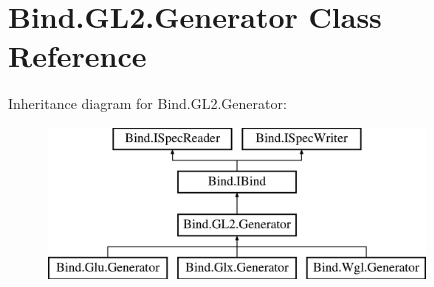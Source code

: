 \hypertarget{class_bind_1_1_g_l2_1_1_generator}{
\section{Bind.GL2.Generator Class Reference}
\label{class_bind_1_1_g_l2_1_1_generator}
}
Inheritance diagram for Bind.GL2.Generator:\begin{figure}[H]
\begin{center}
\leavevmode
\includegraphics[height=4.000000cm]{class_bind_1_1_g_l2_1_1_generator}
\end{center}
\end{figure}
